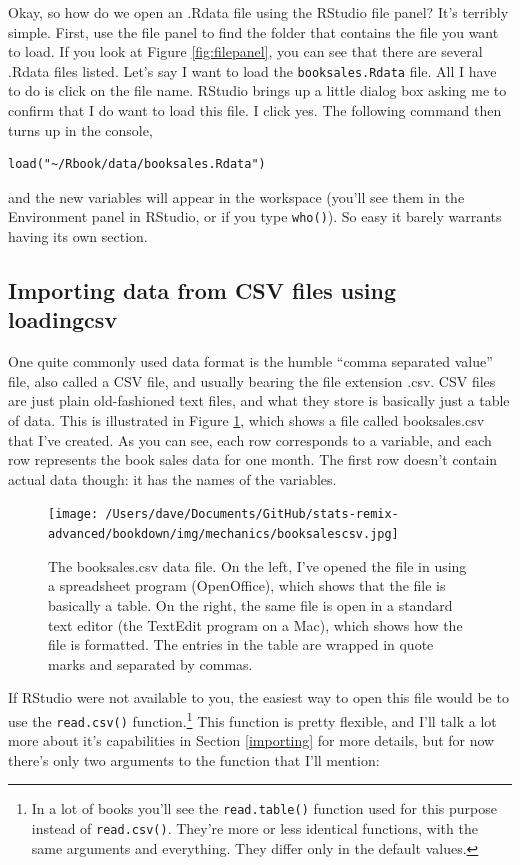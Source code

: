 \documentclass[
]{book}
\begin{document}
Okay, so how do we open an .Rdata file using the RStudio file panel? It's terribly simple. First, use the file panel to find the folder that contains the file you want to load. If you look at Figure \ref{fig:filepanel}, you can see that there are several .Rdata files listed. Let's say I want to load the \texttt{booksales.Rdata} file. All I have to do is click on the file name. RStudio brings up a little dialog box asking me to confirm that I do want to load this file. I click yes. The following command then turns up in the console,

\begin{verbatim}
load("~/Rbook/data/booksales.Rdata")
\end{verbatim}

and the new variables will appear in the workspace (you'll see them in the Environment panel in RStudio, or if you type \texttt{who()}). So easy it barely warrants having its own section.

\hypertarget{loadingcsv}{%
\subsection{Importing data from CSV files using loadingcsv}\label{loadingcsv}}

One quite commonly used data format is the humble ``comma separated value'' file, also called a CSV file, and usually bearing the file extension .csv. CSV files are just plain old-fashioned text files, and what they store is basically just a table of data. This is illustrated in Figure \ref{fig:booksalescsv}, which shows a file called booksales.csv that I've created. As you can see, each row corresponds to a variable, and each row represents the book sales data for one month. The first row doesn't contain actual data though: it has the names of the variables.

\begin{figure}
\centering
\texttt{[image: /Users/dave/Documents/GitHub/stats-remix-advanced/bookdown/img/mechanics/booksalescsv.jpg]}
\caption{\label{fig:booksalescsv}The booksales.csv data file. On the left, I've opened the file in using a spreadsheet program (OpenOffice), which shows that the file is basically a table. On the right, the same file is open in a standard text editor (the TextEdit program on a Mac), which shows how the file is formatted. The entries in the table are wrapped in quote marks and separated by commas.}
\end{figure}

If RStudio were not available to you, the easiest way to open this file would be to use the \texttt{read.csv()} function.\footnote{In a lot of books you'll see the \texttt{read.table()} function used for this purpose instead of \texttt{read.csv()}. They're more or less identical functions, with the same arguments and everything. They differ only in the default values.} This function is pretty flexible, and I'll talk a lot more about it's capabilities in Section \ref{importing} for more details, but for now there's only two arguments to the function that I'll mention:
\end{document}
